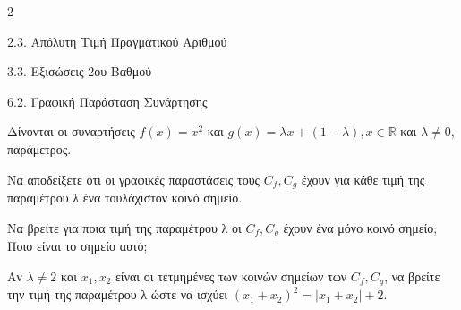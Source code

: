\begin{ylh}{2}
    \item 2.3. Απόλυτη Τιμή Πραγματικού Αριθμού
    \item 3.3. Εξισώσεις 2ου Βαθμού
    \item 6.2. Γραφική Παράσταση Συνάρτησης
\end{ylh}
Δίνονται οι συναρτήσεις $f(x) = x^2$ και $g(x) = \lambda x + (1 - \lambda), x \in \mathbb{R}$ και $\lambda \ne 0$, παράμετρος.

\begin{alist}
\item Να αποδείξετε ότι οι γραφικές παραστάσεις τους $C_f, C_g$ έχουν για κάθε τιμή της παραμέτρου λ ένα τουλάχιστον κοινό σημείο.
\item Να βρείτε για ποια τιμή της παραμέτρου λ οι $C_f, C_g$ έχουν ένα μόνο κοινό σημείο; Ποιο είναι το σημείο αυτό;
\item Αν $\lambda \ne 2$ και $x_1, x_2$ είναι οι τετμημένες των κοινών σημείων των $C_f, C_g$, να βρείτε την τιμή της παραμέτρου λ ώστε να ισχύει $(x_1 + x_2)^2 = |x_1 + x_2| + 2$.
\end{alist}

